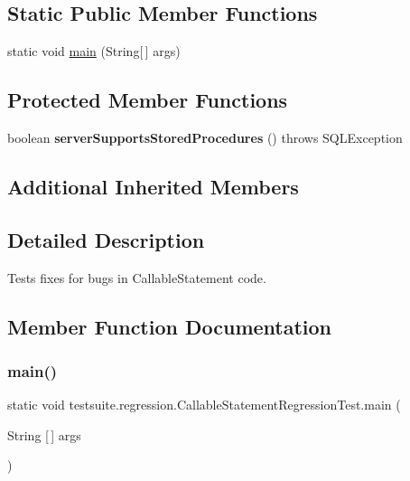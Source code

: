 \subsection*{Static Public Member Functions}
\begin{DoxyCompactItemize}
\item 
static void \mbox{\hyperlink{classtestsuite_1_1regression_1_1_callable_statement_regression_test_a744e4dd9ffdc4244c736939bfe4c98a1}{main}} (String\mbox{[}$\,$\mbox{]} args)
\end{DoxyCompactItemize}
\subsection*{Protected Member Functions}
\begin{DoxyCompactItemize}
\item 
\mbox{\label{classtestsuite_1_1regression_1_1_callable_statement_regression_test_aa85b9a522544c53fc53c01b8cb44d50c}} 
boolean {\bfseries server\+Supports\+Stored\+Procedures} ()  throws S\+Q\+L\+Exception 
\end{DoxyCompactItemize}
\subsection*{Additional Inherited Members}


\subsection{Detailed Description}
Tests fixes for bugs in Callable\+Statement code. 

\subsection{Member Function Documentation}
\mbox{\label{classtestsuite_1_1regression_1_1_callable_statement_regression_test_a744e4dd9ffdc4244c736939bfe4c98a1}} 
\subsubsection{\texorpdfstring{main()}{main()}}
{\footnotesize\ttfamily static void testsuite.\+regression.\+Callable\+Statement\+Regression\+Test.\+main (\begin{DoxyParamCaption}\item[{String \mbox{[}$\,$\mbox{]}}]{args }\end{DoxyParamCaption})\hspace{0.3cm}{\ttfamily [static]}}

